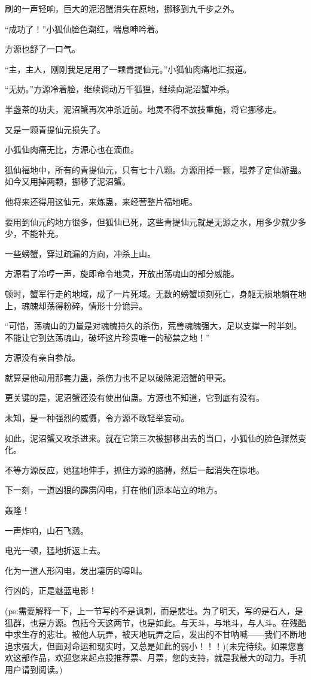 \begin{this_body}
刷的一声轻响，巨大的泥沼蟹消失在原地，挪移到九千步之外。

“成功了！”小狐仙脸色潮红，喘息呻吟着。

方源也舒了一口气。

“主，主人，刚刚我足足用了一颗青提仙元。”小狐仙肉痛地汇报道。

“无妨。”方源冷着脸，继续调动万千狐狸，继续向泥沼蟹冲杀。

半盏茶的功夫，泥沼蟹再次冲杀近前。地灵不得不故技重施，将它挪移走。

又是一颗青提仙元损失了。

小狐仙肉痛无比，方源心也在滴血。

狐仙福地中，所有的青提仙元，只有七十八颗。方源用掉一颗，喂养了定仙游蛊。如今又用掉两颗，挪移了泥沼蟹。

他将来还得用这仙元，来炼蛊，来经营整片福地呢。

要用到仙元的地方很多，但狐仙已死，这些青提仙元就是无源之水，用多少就少多少，不能补充。

一些螃蟹，穿过疏漏的方向，冲杀上山。

方源看了冷哼一声，旋即命令地灵，开放出荡魂山的部分威能。

顿时，蟹军行走的地域，成了一片死域。无数的螃蟹顷刻死亡，身躯无损地躺在地上，魂魄却荡得粉碎，情形十分诡异。

“可惜，荡魂山的力量是对魂魄持久的杀伤，荒兽魂魄强大，足以支撑一时半刻。不能让它到达荡魂山，破坏这片珍贵唯一的秘禁之地！”

方源没有亲自参战。

就算是他动用那套力蛊，杀伤力也不足以破除泥沼蟹的甲壳。

更关键的是，泥沼蟹还没有使出仙蛊。方源也不知道，它到底有没有。

未知，是一种强烈的威慑，令方源不敢轻举妄动。

如此，泥沼蟹又攻杀进来。就在它第三次被挪移出去的当口，小狐仙的脸色骤然变化。

不等方源反应，她猛地伸手，抓住方源的胳膊，然后一起消失在原地。

下一刻，一道凶狠的霹雳闪电，打在他们原本站立的地方。

轰隆！

一声炸响，山石飞溅。

电光一顿，猛地折返上去。

化为一道人形闪电，发出凄厉的嗥叫。

行凶的，正是魅蓝电影！

(ps:需要解释一下，上一节写的不是讽刺，而是悲壮。为了明天，写的是石人，是狐群，也是方源。包括今天这两节，也是如此。与天斗，与地斗，与人斗。在残酷中求生存的悲壮。被他人玩弄，被天地玩弄之后，发出的不甘呐喊——我们不断地追求强大，但面对命运和现实时，又总是如此的弱小！！！)(未完待续。如果您喜欢这部作品，欢迎您来起点投推荐票、月票，您的支持，就是我最大的动力。手机用户请到阅读。)

\end{this_body}

